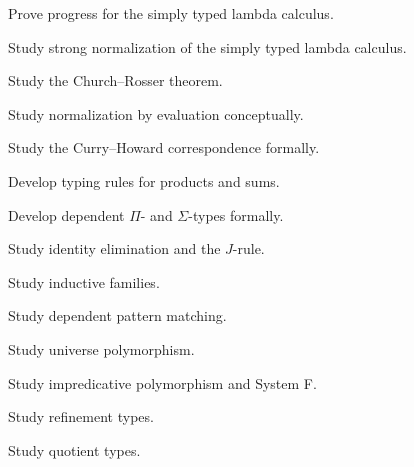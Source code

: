 \begin{exercise}[4]
Prove progress for the simply typed lambda calculus.
\end{exercise}

\begin{exercise}[4]
Study strong normalization of the simply typed lambda calculus.
\end{exercise}

\begin{exercise}[4]
Study the Church--Rosser theorem.
\end{exercise}

\begin{exercise}[4]
Study normalization by evaluation conceptually.
\end{exercise}

\begin{exercise}[4]
Study the Curry--Howard correspondence formally.
\end{exercise}

\begin{exercise}[4]
Develop typing rules for products and sums.
\end{exercise}

\begin{exercise}[4]
Develop dependent \(\Pi\)- and \(\Sigma\)-types formally.
\end{exercise}

\begin{exercise}[4]
Study identity elimination and the \(J\)-rule.
\end{exercise}

\begin{exercise}[4]
Study inductive families.
\end{exercise}

\begin{exercise}[4]
Study dependent pattern matching.
\end{exercise}

\begin{exercise}[4]
Study universe polymorphism.
\end{exercise}

\begin{exercise}[4]
Study impredicative polymorphism and System F.
\end{exercise}

\begin{exercise}[4]
Study refinement types.
\end{exercise}

\begin{exercise}[4]
Study quotient types.
\end{exercise}

